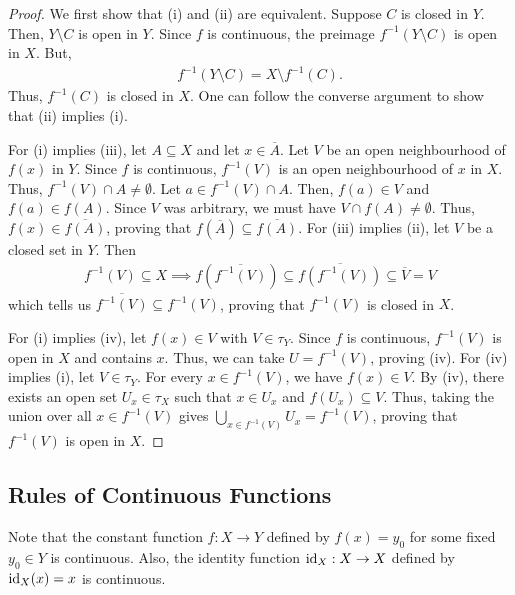\begin{proof}
    We first show that (i) and (ii) are equivalent. Suppose $C$ is closed in $Y$. Then, $Y \setminus C$ is open in $Y$. Since $f$ is continuous, the preimage $f^{-1}(Y \setminus C)$ is open in $X$. But,
    \begin{align}
        f^{-1}(Y \setminus C) = X \setminus f^{-1}(C).
    \end{align}
    Thus, $f^{-1}(C)$ is closed in $X$. One can follow the converse argument to show that (ii) implies (i).

    For (i) implies (iii), let $A \subseteq X$ and let $x \in \overline{A}$. Let $V$ be an open neighbourhood of $f(x)$ in $Y$. Since $f$ is continuous, $f^{-1}(V)$ is an open neighbourhood of $x$ in $X$. Thus, $f^{-1}(V) \cap A \neq \emptyset$. Let $a \in f^{-1}(V) \cap A$. Then, $f(a) \in V$ and $f(a) \in f(A)$. Since $V$ was arbitrary, we must have $V \cap f(A) \neq \emptyset$. Thus, $f(x) \in \overline{f(A)}$, proving that $f(\overline{A}) \subseteq \overline{f(A)}$. For (iii) implies (ii), let $V$ be a closed set in $Y$. Then
    \begin{align}
        f^{-1}(V) \subseteq X \implies f(\overline{f^{-1}(V)}) \subseteq \overline{f(f^{-1}(V))} \subseteq \overline{V} = V
    \end{align}
    which tells us $\overline{f^{-1}(V)} \subseteq f^{-1}(V)$, proving that $f^{-1}(V)$ is closed in $X$.

    For (i) implies (iv), let $f(x) \in V$ with $V \in \tau_{Y}$. Since $f$ is continuous, $f^{-1}(V)$ is open in $X$ and contains $x$. Thus, we can take $U = f^{-1}(V)$, proving (iv). For (iv) implies (i), let $V \in \tau_{Y}$. For every $x \in f^{-1}(V)$, we have $f(x) \in V$. By (iv), there exists an open set $U_{x} \in \tau_{X}$ such that $x \in U_{x}$ and $f(U_{x}) \subseteq V$. Thus, taking the union over all $x \in f^{-1}(V)$ gives $\bigcup_{x \in f^{-1}(V)} U_{x} = f^{-1}(V)$, proving that $f^{-1}(V)$ is open in $X$.
\end{proof}


\subsection{Rules of Continuous Functions}

Note that the constant function $f : X \to Y$ defined by $f(x) = y_{0}$ for some fixed $y_{0} \in Y$ is continuous. Also, the identity function $\operatorname{id}_{X} : X \to X$ defined by $\operatorname{id}_{X}(x) = x$ is continuous.


